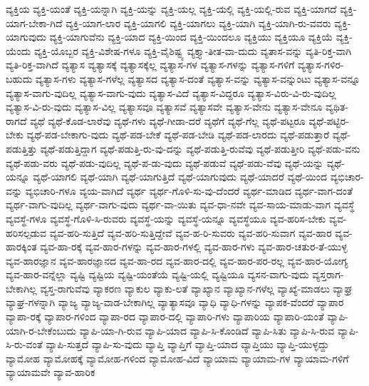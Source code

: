{ವ್ಯಕ್ತಿಯ
ವ್ಯಕ್ತಿ-ಯಂತೆ
ವ್ಯಕ್ತಿ-ಯನ್ನಾಗಿ
ವ್ಯಕ್ತಿ-ಯನ್ನು
ವ್ಯಕ್ತಿ-ಯಲ್ಲ
ವ್ಯಕ್ತಿ-ಯಲ್ಲಿ
ವ್ಯಕ್ತಿ-ಯಲ್ಲಿ-ರುವ
ವ್ಯಕ್ತಿ-ಯಾಗದೆ
ವ್ಯಕ್ತಿ-ಯಾಗ-ಬೇಕಾ-ಗಿದೆ
ವ್ಯಕ್ತಿ-ಯಾಗ-ಲಾರ
ವ್ಯಕ್ತಿ-ಯಾಗಲಿ
ವ್ಯಕ್ತಿ-ಯಾಗಲು
ವ್ಯಕ್ತಿ-ಯಾಗಿ
ವ್ಯಕ್ತಿ-ಯಾಗಿ-ರು-ವವರು
ವ್ಯಕ್ತಿ-ಯಾಗುವುದು
ವ್ಯಕ್ತಿ-ಯಾಗುವೆನು
ವ್ಯಕ್ತಿ-ಯಾದ
ವ್ಯಕ್ತಿ-ಯಿಂದ
ವ್ಯಕ್ತಿ-ಯಿಂದಲೂ
ವ್ಯಕ್ತಿಯು
ವ್ಯಕ್ತಿಯೂ
ವ್ಯಕ್ತಿಯೆ
ವ್ಯಕ್ತಿ-ಯೆಂದು
ವ್ಯಕ್ತಿ-ಯೊಬ್ಬರ
ವ್ಯಕ್ತಿ-ವಿಶೇಷ-ಗಳೂ
ವ್ಯಕ್ತಿ-ವೈಶಿಷ್ಟ್ಯ
ವ್ಯಕ್ತ್ಯಾ-ತೀತ-ವಾ-ದುದು
ವ್ಯತಾಸ-ವನ್ನು
ವ್ಯತಿ-ರಿಕ್ತ-ವಾಗಿ
ವ್ಯತಿ-ರಿಕ್ತ-ವಾಗಿದೆ
ವ್ಯತ್ಯಾಸ
ವ್ಯತ್ಯಾಸಕ್ಕೆ
ವ್ಯತ್ಯಾಸಕ್ಕೆಲ್ಲ
ವ್ಯತ್ಯಾಸ-ಗಳ
ವ್ಯತ್ಯಾಸ-ಗಳನ್ನು
ವ್ಯತ್ಯಾಸ-ಗಳಿಗೆ
ವ್ಯತ್ಯಾಸ-ಗಳಿರ-ಬಹುದು
ವ್ಯತ್ಯಾಸ-ಗಳು
ವ್ಯತ್ಯಾಸ-ಗಳೆಲ್ಲ
ವ್ಯತ್ಯಾಸದ
ವ್ಯತ್ಯಾಸ-ದಂತೆ
ವ್ಯತ್ಯಾಸ-ವನ್ನು
ವ್ಯತ್ಯಾಸ-ವನ್ನುಂಟು
ವ್ಯತ್ಯಾಸ-ವನ್ನೂ
ವ್ಯತ್ಯಾಸ-ವಾಗು-ವುದಿಲ್ಲ
ವ್ಯತ್ಯಾಸ-ವಾಗು-ವುದು
ವ್ಯತ್ಯಾಸ-ವಿದೆ
ವ್ಯತ್ಯಾಸ-ವಿದ್ದರೂ
ವ್ಯತ್ಯಾಸ-ವಿರು-ವಿ-ರು-ವುದಿಲ್ಲ
ವ್ಯತ್ಯಾಸ-ವಿ-ರು-ವುದು
ವ್ಯತ್ಯಾಸ-ವಿಲ್ಲ
ವ್ಯತ್ಯಾಸವೂ
ವ್ಯತ್ಯಾಸವೆ
ವ್ಯತ್ಯಾಸವೇ
ವ್ಯತ್ಯಾಸ-ವೇನು
ವ್ಯತ್ಯಾಸ-ವೇನೂ
ವ್ಯಥಿತ-ರಾಗದೆ
ವ್ಯಥೆ
ವ್ಯಥೆ-ಕೊಡ-ಲಾರೆವು
ವ್ಯಥೆ-ಗಳು
ವ್ಯಥೆ-ಗೀಡಾ-ದರೆ
ವ್ಯಥೆಗೆ
ವ್ಯಥೆ-ಗೆಲ್ಲ
ವ್ಯಥೆ-ಪಟ್ಟರೂ
ವ್ಯಥೆ-ಪಟ್ಟಿರ-ಬೇಕು
ವ್ಯಥೆ-ಪಡ-ಬೇಕಾಗು-ವುದು
ವ್ಯಥೆ-ಪಡ-ಬೇಕೆ
ವ್ಯಥೆ-ಪಡ-ಬೇಡಿ
ವ್ಯಥೆ-ಪಡ-ಲಾರದು
ವ್ಯಥೆ-ಪಡುತ್ತಾರೆ
ವ್ಯಥೆ-ಪಡುತ್ತಿತ್ತು
ವ್ಯಥೆ-ಪಡುತ್ತಿದ್ದಾಗ
ವ್ಯಥೆ-ಪಡುತ್ತಿ-ರು-ವು-ದನ್ನು
ವ್ಯಥೆ-ಪಡುತ್ತಿ-ರುವೆವು
ವ್ಯಥೆ-ಪಡುತ್ತೀರಿ
ವ್ಯಥೆ-ಪಡು-ವನು
ವ್ಯಥೆ-ಪಡು-ವರು
ವ್ಯಥೆ-ಪಡು-ವುದಿಲ್ಲ
ವ್ಯಥೆ-ಪ-ಡು-ವುದು
ವ್ಯಥೆ-ಪಡುವೆ
ವ್ಯಥೆ-ಪಡು-ವೆವು
ವ್ಯಥೆ-ಯನ್ನು
ವ್ಯಥೆ-ಯನ್ನೂ
ವ್ಯಥೆ-ಯಾಗಲಿ
ವ್ಯಥೆ-ಯಾಗಿ
ವ್ಯಥೆ-ಯಾಗುತ್ತಿದೆ
ವ್ಯಥೆ-ಯಾಗುವುದು
ವ್ಯಥೆ-ಯಾದರೆ
ವ್ಯಥೆ-ಯಿಂದ
ವ್ಯಭಿಚಾರ-ವನ್ನು
ವ್ಯಭಿಚಾರಿ-ಗಳೂ
ವ್ಯಯ-ವಾಗಿದೆ
ವ್ಯರ್ಥ
ವ್ಯರ್ಥ-ಗೊಳಿ-ಸು-ವು-ದೆಂದರೆ
ವ್ಯರ್ಥ-ಮಾಡಿದ
ವ್ಯರ್ಥ-ವಾಗ-ದಂತೆ
ವ್ಯರ್ಥ-ವಾಗು-ವುದಿಲ್ಲ
ವ್ಯರ್ಥ-ವಾಗು-ವುದು
ವ್ಯರ್ಥ-ವಾ-ಯಿತು
ವ್ಯವ-ಧಾ-ನವೇ
ವ್ಯವ-ಸಾಯ-ಮಾಡು-ವಾಗ
ವ್ಯವಸ್ಥೆ
ವ್ಯವಸ್ಥೆ-ಗಳೂ
ವ್ಯವಸ್ಥೆ-ಗೊಳಿ-ಸಿ-ರುವರು
ವ್ಯವಸ್ಥೆ-ಯನ್ನು
ವ್ಯವಸ್ಥೆ-ಯನ್ನೂ
ವ್ಯವಸ್ಥೆಯೂ
ವ್ಯವ-ಹರಿಸ-ಬೇಕು
ವ್ಯವ-ಹರಿಸಲ್ಪಡುವ
ವ್ಯವ-ಹರಿ-ಸುತ್ತಿದೆ
ವ್ಯವ-ಹರಿ-ಸುತ್ತಿದ್ದೇವೆ
ವ್ಯವ-ಹ-ರಿ-ಸುವರು
ವ್ಯವ-ಹರಿ-ಸುವಾಗ
ವ್ಯವ-ಹಾರ
ವ್ಯವ-ಹಾರಕ್ಕಿಂತ
ವ್ಯವ-ಹಾ-ರಕ್ಕೆ
ವ್ಯವ-ಹಾರ-ಗಳನ್ನು
ವ್ಯವ-ಹಾರ-ಗಳಲ್ಲಿ
ವ್ಯವ-ಹಾರ-ಗಳು
ವ್ಯವ-ಹಾರ-ಚತುರ-ತೆ-ಯುಳ್ಳ
ವ್ಯವ-ಹಾರಜ್ಞಾನ
ವ್ಯವ-ಹಾರಜ್ಞಾನದ
ವ್ಯವ-ಹಾ-ರದ
ವ್ಯವ-ಹಾರ-ದಲ್ಲಿ
ವ್ಯವ-ಹಾರ-ಪರ-ರಲ್ಲ
ವ್ಯವ-ಹಾರ-ಯೋಗ್ಯ
ವ್ಯವ-ಹಾರ-ವನ್ನೆಲ್ಲಾ
ವ್ಯಷ್ಟಿ
ವ್ಯಷ್ಟಿಯ
ವ್ಯಷ್ಟಿ-ಯಂತೆಯೆ
ವ್ಯಷ್ಟಿ-ಯಲ್ಲಿ
ವ್ಯಷ್ಟಿಯೂ
ವ್ಯಸನ-ವಾಗು-ವುದು
ವ್ಯಸ್ತರಾಗ-ಬೇಕಾಗಿಲ್ಲ
ವ್ಯಸ್ತ-ರಾಗುವೆವು
ವ್ಯಾಕರಣ
ವ್ಯಾಕುಲ
ವ್ಯಾಕು-ಲತೆ
ವ್ಯಾಖ್ಯಾನ
ವ್ಯಾಖ್ಯಾನ-ಗಳೆಲ್ಲ
ವ್ಯಾಖ್ಯೆ-ಮಾಡಲು
ವ್ಯಾಘ್ರ
ವ್ಯಾಘ್ರ-ಗಳನ್ನಾಗಿ
ವ್ಯಾಜ್ಯ
ವ್ಯಾಜ್ಯ-ವಾಡ-ಬೇಕಾಗಿಲ್ಲ
ವ್ಯಾತ್ಯಾಸವೂ
ವ್ಯಾಧಿ
ವ್ಯಾಧಿ-ಗಳನ್ನು
ವ್ಯಾಪಕ-ವೆಂದರೆ
ವ್ಯಾಪಾರ
ವ್ಯಾಪಾ-ರಕ್ಕೆ
ವ್ಯಾಪಾರ-ಗಳಿಂದ
ವ್ಯಾಪಾ-ರದ
ವ್ಯಾಪಾರ-ದಲ್ಲಿ
ವ್ಯಾಪಾರಿ-ಗಳು
ವ್ಯಾಪಾರಿಯ
ವ್ಯಾಪಾರಿ-ಯಂತೆ
ವ್ಯಾಪಿ-ಯಾಗಿ-ರ-ಬೇಕೆಂಬುದು
ವ್ಯಾಪಿ-ಯಾ-ಗಿ-ರುವ
ವ್ಯಾಪಿ-ಯಾದ
ವ್ಯಾಪಿ-ಸಿ-ಕೊಂಡಿದೆ
ವ್ಯಾಪಿ-ಸಿತು
ವ್ಯಾಪಿ-ಸಿ-ರುವ
ವ್ಯಾಪಿ-ಸಿ-ರು-ವಂತೆ
ವ್ಯಾಪಿ-ಸುತ್ತದೆ
ವ್ಯಾಪಿ-ಸು-ವುದು
ವ್ಯಾಪ್ತಿ
ವ್ಯಾಪ್ತಿಗೆ
ವ್ಯಾಪ್ತಿ-ಯಾದ
ವ್ಯಾಪ್ತಿಯು
ವ್ಯಾಪ್ತಿ-ಯುಳ್ಳದ್ದು
ವ್ಯಾಮೋಹ
ವ್ಯಾಮೋಹಕ್ಕೆ
ವ್ಯಾಮೋಹ-ಗಳಿಂದ
ವ್ಯಾಮೋಹ-ವಿದೆ
ವ್ಯಾಯಾಮ
ವ್ಯಾಯಾಮ-ಗಳ
ವ್ಯಾಯಾಮ-ಗಳಿಗೆ
ವ್ಯಾಯಾಮವೇ
ವ್ಯಾವ-ಹಾರಿಕ
}
